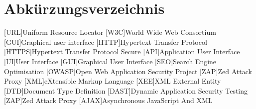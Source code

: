 \newpage
\chapter*{Abkürzungsverzeichnis}
\begin{acronym}
    [URL]{Uniform Resource Locator}
    [W3C]{World Wide Web Consortium}
    [GUI]{Graphical user interface}
    [HTTP]{Hypertext Transfer Protocol}
    [HTTPS]{Hypertext Transfer Protocol Secure}
    [API]{Application User Interface}
    [UI]{User Interface}
    [GUI]{Graphical User Interface}
    [SEO]{Search Engine Optimisation}
    [OWASP]{Open Web Application Security Project}
    [ZAP]{Zed Attack Proxy}
    [XML]{eXtensible Markup Language}
    [XEE]{XML External Entity}
    [DTD]{Document Type Definition}
    [DAST]{Dynamic Application Security Testing}
    [ZAP]{Zed Attack Proxy}
    [AJAX]{Asynchronous JavaScript And XML}
\end{acronym}